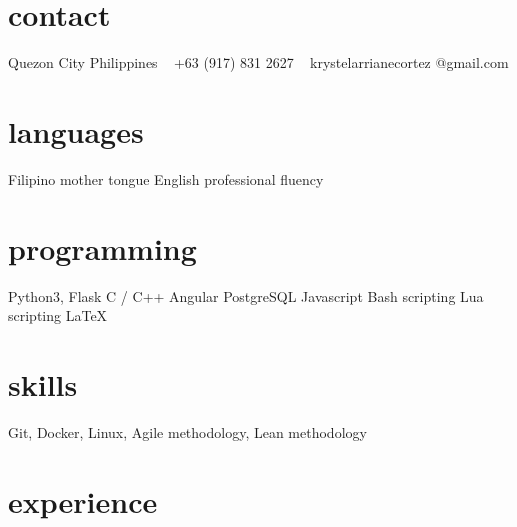 \documentclass[print]{cv-style}          %
\begin{document}
\lastupdated


\begin{aside}
%
\section{contact}
Quezon City
Philippines
~
+63 (917) 831 2627
~
krystelarrianecortez
@gmail.com
%
\section{languages}
Filipino mother tongue
English professional fluency
%
\section{programming}
Python3, Flask 
C / C++ 
Angular 
PostgreSQL  
Javascript 
Bash scripting 
Lua scripting 
\LaTeX{}
%
\end{aside}


\section{skills}
  \vspace{-0.2cm}

Git, Docker, Linux, Agile methodology, Lean methodology


\section{experience}
\end{document}
